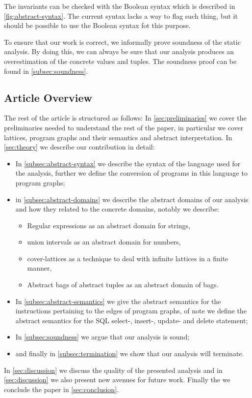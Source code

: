 The invariants can be checked with the Boolean syntax which is described in \autoref{fig:abstract-syntax}.
The current syntax lacks a way to flag such thing, but it should be possible to use the Boolean syntax fot this purpose.

To ensure that our work is correct, we informally prove soundness of the static analysis.
By doing this, we can always be sure that our analysis produces an overestimation of the concrete values and tuples.
The soundness proof can be found in \autoref{subsec:soundness}.

\subsection{Article Overview}\label{subsec:article-overview}
The rest of the article is structured as follows:
In \autoref{sec:preliminaries} we cover the preliminaries needed to understand the rest of the paper, in particular we cover lattices, program graphs and their semantics and abstract interpretation.
In \autoref{sec:theory} we describe our contribution in detail:

\begin{itemize}
    \item In \autoref{subsec:abstract-syntax} we describe the syntax of the language used for the analysis, further we define the conversion of programs in this language to program graphs;
    \item in \autoref{subsec:abstract-domains} we describe the abstract domains of our analysis and how they related to the concrete domains, notably we describe:
    \begin{itemize}
        \item Regular expressions as an abstract domain for strings,
        \item union intervals as an abstract domain for numbers,
        \item cover-lattices as a technique to deal with infinite lattices in a finite manner,
        \item Abstract bags of abstract tuples as an abstract domain of bags.
    \end{itemize}
    \item In \autoref{subsec:abstract-semantics} we give the abstract semantics for the instructions pertaining to the edges of program graphs, of note we define the abstract semantics for the SQL select-, insert-, update- and delete statement;
    \item In \autoref{subsec:soundness} we argue that our analysis is sound;
    \item and finally in \autoref{subsec:termination} we show that our analysis will terminate.
\end{itemize}

In \autoref{sec:discussion} we discuss the quality of the presented analysis and in \autoref{sec:discussion} we also present new avenues for future work.
Finally the we conclude the paper in \autoref{sec:conclusion}.




